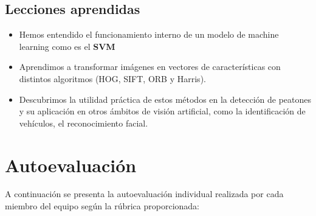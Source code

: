 \documentclass[a4paper]{article}
\begin{document}
\subsection{Lecciones aprendidas}

\begin{itemize}
    \item Hemos entendido el funcionamiento interno de un modelo de machine learning como es el \textbf{SVM}
    
    \item Aprendimos a transformar imágenes en vectores de características con distintos algoritmos (HOG, SIFT, ORB y Harris).
        
    \item Descubrimos la utilidad práctica de estos métodos en la detección de peatones y su aplicación en otros ámbitos de visión artificial, como la identificación de vehículos, el reconocimiento facial.
\end{itemize}






\newpage
\section{Autoevaluación}
A continuación se presenta la autoevaluación individual realizada por cada miembro del equipo según la rúbrica proporcionada:
\end{document}

